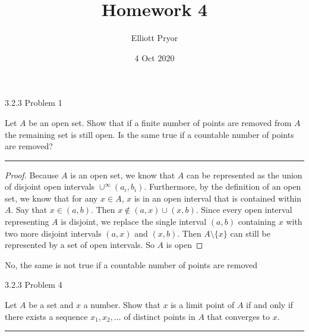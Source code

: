 \documentclass[11pt]{article}
\title{Homework 4}
\author{Elliott Pryor}
\date{4 Oct 2020}
\begin{document}
\maketitle



 3.2.3 Problem 1

Let $A$ be an open set. Show that if a finite number of points are removed from $A$ the remaining set is still open. Is the same true if a countable number of points are removed?
\hrule

\begin{proof}

Because $A$ is an open set, we know that $A$ can be represented as the union of disjoint open intervals $\cup^\infty (a_i, b_i)$. 
Furthermore, by the definition of an open set, we know that for any $x \in A$, $x$ is in an open interval that is contained within $A$.
Say that $x \in (a, b)$. Then $x \notin (a, x)\cup(x,b)$. Since every open interval representing $A$ is disjoint, we replace the single interval $(a,b)$ containing $x$ with two more disjoint intervals $(a, x)$ and $(x, b)$. Then $A \setminus \{x\}$ can still be represented by a set of open intervals. So $A$ is open
\end{proof}

No, the same is not true if a countable number of points are removed




\newpage
{} 3.2.3 Problem 4

Let $A$ be a set and $x$ a number. Show that $x$ is a limit point of $A$ if and only if there exists a sequence $x_1, x_2, ...$ of distinct points in $A$ that converges to $x$.

\hrule
\end{document}
